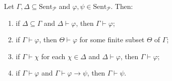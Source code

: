 Let $\Gamma, \Delta \subseteq \text{Sent}_{\mathcal{P}}$ and $\varphi, \psi \in \text{Sent}_{\mathcal{P}}$. Then:
\begin{enumerate}
\item[(i)] if $\Delta \subseteq \Gamma$ and $\Delta \vdash \varphi$, then $\Gamma \vdash \varphi$;
\item[(ii)] if $\Gamma \vdash \varphi$, then $\Theta \vdash \varphi$ for some finite subset $\Theta$ of $\Gamma$;
\item[(iii)] if $\Gamma \vdash \chi$ for each $\chi \in \Delta$ and $\Delta \vdash \varphi$, then $\Gamma \vdash \varphi$;
\item[(iv)] if $\Gamma \vdash \varphi$ and $\Gamma \vdash \varphi \to \psi$, then $\Gamma \vdash \psi$.
\end{enumerate}
